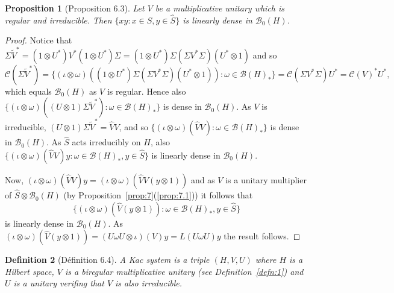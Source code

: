\documentclass[a4paper,12pt]{article}
\theoremstyle{plain}
\newtheorem{proposition}{Proposition}[section]
\newtheorem{definition}[proposition]{Definition}
\theoremstyle{definition}
\newcommand{\mc}{\mathcal}
\begin{document}
\begin{proposition}[Proposition 6.3]
Let $V$ be a multiplicative unitary which is regular and irreducible.
Then $\{xy : x\in S, y\in \hat S \}$ is linearly dense in $\mc B_0(H)$.
\end{proposition}
\begin{proof}
Notice that $\Sigma\tilde V^* = (1\otimes U^*)V^*(1\otimes U^*)\Sigma
= (1\otimes U^*)\Sigma(\Sigma V^*\Sigma)(U^*\otimes 1)$ and so
\[ \mc C(\Sigma\tilde V^*) = \{ (\iota\otimes\omega)
((1\otimes U^*)\Sigma(\Sigma V^*\Sigma)(U^*\otimes 1)) : \omega\in\mc B(H)_* \}
= \mc C(\Sigma V^*\Sigma) U^* = \mc C(V)^*U^*, \]
which equals $\mc B_0(H)$ as $V$ is regular.  Hence also
$\{ (\iota\otimes\omega) ((U\otimes 1)\Sigma\tilde V^*)
: \omega\in\mc B(H)_* \}$ is dense in $\mc B_0(H)$.  As $V$ is irreducible,
$(U\otimes 1)\Sigma\tilde V^* = \hat VV$, and so
$\{ (\iota\otimes\omega) (\hat VV) : \omega\in\mc B(H)_* \}$
is dense in $\mc B_0(H)$.  As $\hat S$ acts irreducibly on $H$, also
$\{ (\iota\otimes\omega) (\hat VV)y : \omega\in\mc B(H)_*, y\in\hat S \}$
is linearly dense in $\mc B_0(H)$.

Now, $(\iota\otimes\omega) (\hat VV)y = (\iota\otimes\omega)
(\hat VV(y\otimes 1))$ and as $V$ is a unitary multiplier of
$\hat S\otimes\mc B_0(H)$ (by Proposition~\ref{prop:7}(\ref{prop:7.1}))
it follows that
\[ \{ (\iota\otimes\omega) (\hat V(y\otimes 1)) :
\omega\in\mc B(H)_*, y\in\hat S \} \]
is linearly dense in $\mc B_0(H)$.  As $(\iota\otimes\omega)(\hat V(y\otimes 1))
= (U\omega U\otimes\iota)(V) y = L(U\omega U)y$ the result follows.
\end{proof}

\begin{definition}[D\'efinition 6.4]
A \emph{Kac system} is a triple $(H,V,U)$ where $H$ is a Hilbert space,
$V$ is a biregular multiplicative unitary (see Definition~\ref{defn:1})
and $U$ is a unitary verifing that $V$ is also irreducible.
\end{definition}
\end{document}
